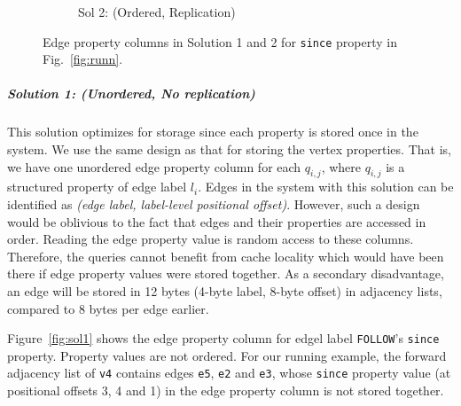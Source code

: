 \begin{figure}
\begin{subfigure}{0.55\textwidth}
		\captionsetup{justification=centering}
		\caption{Sol 2: (Ordered, Replication)}
		\label{fig:sol2}
	\end{subfigure}
	\captionsetup{justification=centering}
	\caption{Edge property columns in Solution 1 and 2 for \texttt{since} property in Fig.~\ref{fig:runn}.}
	\label{fig:sol1and2}
	\vspace{-8pt}
\end{figure}

\vspace{-12pt}
\subparagraph{Solution 1: (Unordered, No replication) } This solution optimizes for storage since each property is stored once in the system. We use the same design as that for storing the vertex properties. That is, we have one unordered edge property column for each $q_{i,j}$, where $q_{i,j}$ is a structured property of edge label $l_i$. Edges in the system with this solution can be identified as \emph{(edge label, label-level positional offset)}. However, such a design would be oblivious to the fact that edges and their properties are accessed in order. Reading the edge property value is random access to these columns. Therefore, the queries cannot benefit from cache locality which would have been there if edge property values were stored together. As a secondary disadvantage, an edge will be stored in 12 bytes (4-byte label, 8-byte offset) in adjacency lists, compared to 8 bytes per edge earlier.

Figure~\ref{fig:sol1} shows the edge property column for edgel label \texttt{FOLLOW}'s \texttt{since} property. Property values are not ordered. For our running example, the forward adjacency list of \texttt{v4} contains edges \texttt{e5}, \texttt{e2} and \texttt{e3}, whose \texttt{since} property value (at positional offsets 3, 4 and 1) in the edge property column is not stored together. 

\vspace{-12pt}

